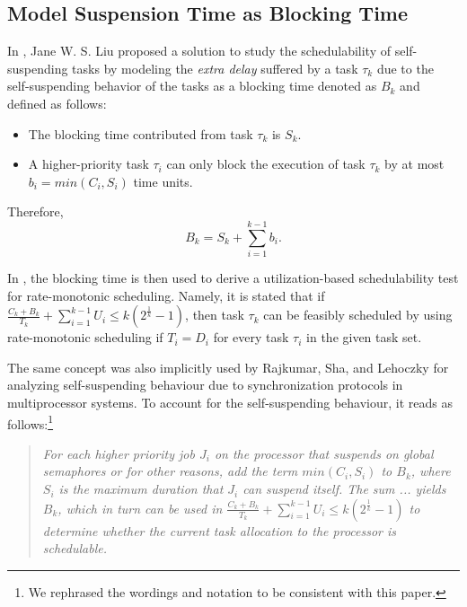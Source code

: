 \documentclass[10pt,conference,preprint]{IEEEtran}
\begin{document}
\subsection{Model Suspension Time as Blocking Time}
\label{sec:suspension-blocking}

In \cite[Pages 164-165]{Liu:2000:RS:518501}, Jane W. S. Liu proposed a solution to study the schedulability of self-suspending tasks by modeling the \emph{extra delay} suffered by a task $\tau_k$ due to the self-suspending behavior of the tasks as a blocking time denoted as $B_k$ and defined as follows:
\begin{itemize}
\item The blocking time contributed from task $\tau_k$ is $S_k$. 
\item A higher-priority task $\tau_i$ can only block the execution of task $\tau_k$ by at most $b_i=min(C_i, S_i)$ time units.
\end{itemize}
Therefore, 
\begin{equation}
\label{eq:Bk}
B_k = S_k + \sum_{i=1}^{k-1} b_i.
\end{equation}

In \cite{Liu:2000:RS:518501}, the blocking time is then used to derive a utilization-based schedulability test for rate-monotonic scheduling. Namely, it is stated that if $\frac{C_k+B_k}{T_k} + \sum_{i=1}^{k-1} U_i \leq k (2^{\frac{1}{k}}-1)$, then task $\tau_k$ can be feasibly scheduled by using rate-monotonic scheduling if $T_i=D_i$ for every task $\tau_i$ in the given task set. 
  

The same concept was also implicitly used by Rajkumar, Sha, and Lehoczky \cite[Page 267]{DBLP:conf/rtss/RajkumarSL88} for analyzing self-suspending behaviour due to synchronization protocols in multiprocessor systems. To account for the self-suspending behaviour, it reads as follows:\footnote{We rephrased the wordings and notation to be consistent with this paper.}
\begin{quote}
\emph{For each higher priority job $J_i$ on the processor that suspends on global semaphores or for other reasons, add the term $min(C_i, S_i)$ to $B_k$, where $S_i$ is the maximum duration that $J_i$ can suspend itself. The sum ... yields $B_k$, which in turn can be used in 
$\frac{C_k+B_k}{T_k} + \sum_{i=1}^{k-1} U_i \leq k (2^{\frac{1}{k}}-1)$ to determine whether the current task allocation to the processor is schedulable.}
\end{quote}
  
\end{document}
